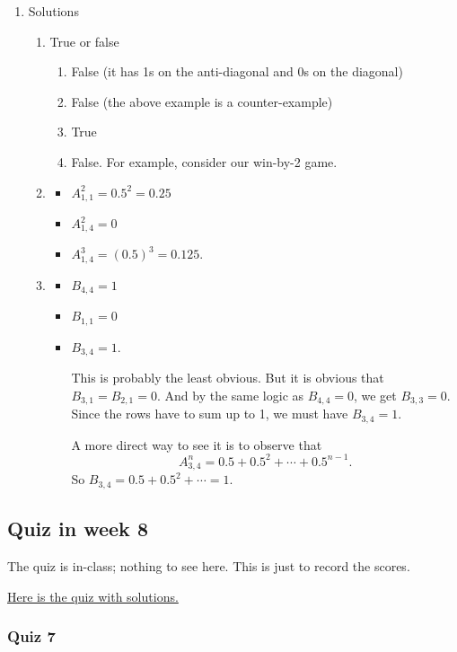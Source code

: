 \documentclass{amsart}
\begin{document}
\begin{enumerate}
\item Solutions
\label{sec:org9fe7144}
\begin{enumerate}
\item True or false
\begin{enumerate}
\item False (it has 1s on the anti-diagonal and 0s on the diagonal)
\item False (the above example is a counter-example)
\item True
\item False.  For example, consider our win-by-2 game.
\end{enumerate}
\item \begin{itemize}
\item \(A^2_{1,1} = 0.5^2 = 0.25\)
\item \(A^2_{1,4} = 0\)
\item \(A^3_{1,4} = (0.5)^3 = 0.125.\)
\end{itemize}
\item \begin{itemize}
\item \(B_{4,4} = 1\)
\item \(B_{1,1} = 0\)
\item \(B_{3,4} = 1\).

This is probably the least obvious.  But it is obvious that \(B_{3,1} = B_{2,1} = 0\).  And by the same logic as \(B_{4,4} = 0\), we get \(B_{3,3} = 0\).  Since the rows have to sum up to 1, we must have \(B_{3,4} = 1\).

A more direct way to see it is to observe that
\[ A^n_{3,4} = 0.5 + 0.5^2 + \cdots + 0.5^{n-1}.\]
So \(B_{3,4} = 0.5 + 0.5^2 + \cdots  = 1.\)
\end{itemize}
\end{enumerate}
\end{enumerate}
\subsection{Quiz in week 8}
\label{sec:orgab70f27}
The quiz is in-class; nothing to see here.  This is just to record the scores.

\href{https://canvas.anu.edu.au/files/866148/download?download\_frd=1\&verifier=yEVyjyFHeBSCDBgUOidjIOuafYIYOQTqZeT5K6LT}{Here is the quiz with solutions.}
\subsubsection{Quiz 7}
\label{sec:orgbb5eb27}
\thispagestyle{empty}
\end{document}
